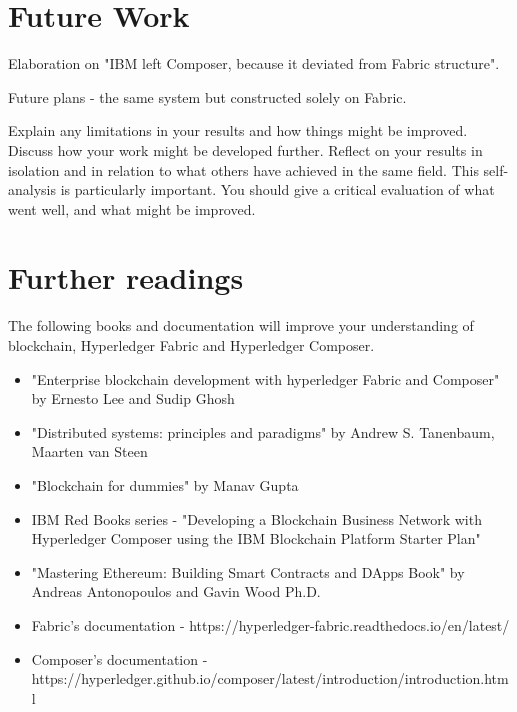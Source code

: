 \documentclass[a4paper,11pt]{report}
\begin{document}
\section{Future Work}

\label{conclusion-future}

Elaboration on "IBM left Composer, because it deviated from Fabric structure".

Future plans - the same system but constructed solely on Fabric.	


Explain any limitations in your results and how things might be improved.
Discuss how your work might be developed further. Reflect on your results in
isolation and in relation to what others have achieved in the same field. This
self-analysis is particularly important. You should give a critical evaluation
of what went well, and what might be improved.

\section{Further readings}
The following books and documentation will improve your understanding of blockchain, Hyperledger Fabric and Hyperledger Composer.

\begin{itemize}
	\item "Enterprise blockchain development with hyperledger Fabric and Composer" by Ernesto Lee and Sudip Ghosh
	\item "Distributed systems: principles and paradigms" by Andrew S. Tanenbaum, Maarten van Steen
	\item "Blockchain for dummies" by Manav Gupta 
	\item IBM Red Books series - "Developing a Blockchain Business Network with Hyperledger Composer using the IBM Blockchain Platform Starter Plan" 
	\item "Mastering Ethereum: Building Smart Contracts and DApps Book" by Andreas Antonopoulos and Gavin Wood Ph.D.
	\item Fabric's documentation - https://hyperledger-fabric.readthedocs.io/en/latest/
	\item Composer's documentation - https://hyperledger.github.io/composer/latest/introduction/introduction.html
\end{itemize}





\end{document}
